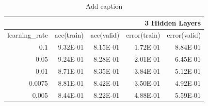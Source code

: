 \documentclass{article}
\begin{document}
\begin{table}[htbp]
  \centering
  \caption{Add caption}
    \begin{tabular}{|r|r|r|r|r|}
    \toprule
    \multicolumn{5}{|p{25em}|}{3 Hidden Layers} \\
    \midrule
    \multicolumn{1}{|r|}{\multirow{2}[2]{*}{learning\_rate}} & \multicolumn{1}{r|}{\multirow{2}[2]{*}{acc(train)}} & \multicolumn{1}{r|}{\multirow{2}[2]{*}{acc(valid)}} & \multicolumn{1}{r|}{\multirow{2}[2]{*}{error(train)}} & \multicolumn{1}{r|}{\multirow{2}[2]{*}{error(valid)}} \\
          &       &       &       &  \\
    \midrule
    \multirow{2}[2]{*}{0.1} & \multirow{2}[2]{*}{9.32E-01} & \multirow{2}[2]{*}{8.15E-01} & \multirow{2}[2]{*}{1.72E-01} & \multirow{2}[2]{*}{8.84E-01} \\
          &       &       &       &  \\
    \midrule
    \multirow{2}[2]{*}{0.05} & \multirow{2}[2]{*}{9.24E-01} & \multirow{2}[2]{*}{8.28E-01} & \multirow{2}[2]{*}{2.01E-01} & \multirow{2}[2]{*}{6.45E-01} \\
          &       &       &       &  \\
    \midrule
    \multirow{2}[2]{*}{0.01} & \multirow{2}[2]{*}{8.71E-01} & \multirow{2}[2]{*}{8.35E-01} & \multirow{2}[2]{*}{3.84E-01} & \multirow{2}[2]{*}{5.12E-01} \\
          &       &       &       &  \\
    \midrule
    \multirow{2}[2]{*}{0.0075} & \multirow{2}[2]{*}{8.81E-01} & \multirow{2}[2]{*}{8.42E-01} & \multirow{2}[2]{*}{3.50E-01} & \multirow{2}[2]{*}{4.92E-01} \\
          &       &       &       &  \\
    \midrule
    \multirow{2}[2]{*}{0.005} & \multirow{2}[2]{*}{8.44E-01} & \multirow{2}[2]{*}{8.22E-01} & \multirow{2}[2]{*}{4.88E-01} & \multirow{2}[2]{*}{5.59E-01} \\
          &       &       &       &  \\
    \bottomrule
    \end{tabular}%
  \label{tab:addlabel}%
\end{table}%
\end{document}
